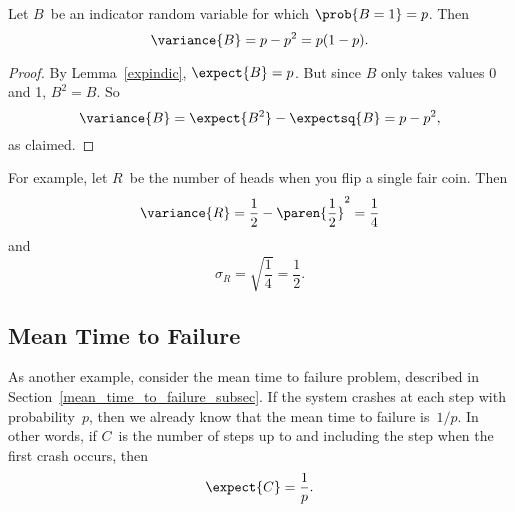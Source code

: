 \begin{lemma}\label{bernoulli-variance}
Let $B$~be an indicator random variable for which $\prob{B = 1} = p$.
Then
\begin{equation}
    \variance{B} = p-p^2 = p(1-p).
\end{equation}
\end{lemma}

\begin{proof}
  By Lemma~\ref{expindic}, $\expect{B}= p$.  But since $B$ only takes
  values 0 and 1, $B^2 = B$.  So 
\begin{equation*}
    \variance{B} = \expect{B^2} - \expectsq{B} = p - p^2,
\end{equation*}
as claimed.
\end{proof}

For example, let $R$~be the number of heads when you flip a single
fair coin.  Then
\begin{equation}\label{eqn:18H1}
    \variance{R} = \frac{1}{2} - \paren{\frac{1}{2}}^2 = \frac{1}{4}
\end{equation}
and
\begin{equation*}
    \sigma_R = \sqrt{\frac{1}{4}} = \frac{1}{2}.
\end{equation*}

\subsection{Mean Time to Failure}

As another example, consider the mean time to failure problem,
described in Section~\ref{mean_time_to_failure_subsec}.  If the system
crashes at each step with probability~$p$, then we already know that
the mean time to failure is~$1/p$.  In other words, if $C$~is the
number of steps up to and including the step when the first crash
occurs, then
\begin{equation*}
    \expect{C} = \frac{1}{p}.
\end{equation*}

